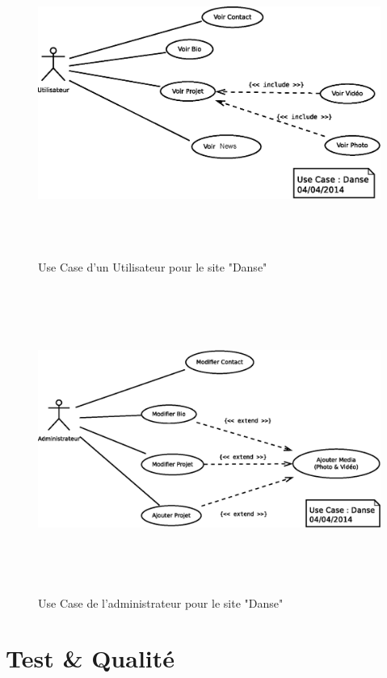 \documentclass[11pt,a4paper]{report}
\begin{document}
				\begin{figure}[H]
					\centering
					\includegraphics[height=10cm]{UseCase-Danse-User.eps}
					\caption[Use Case Utilisateur Danse]{Use Case d'un Utilisateur pour le site "Danse"}
					\label{fig:UseCase-Danse_User}
				\end{figure}
				\begin{figure}[H]
					\centering
					\includegraphics[height=10cm]{UseCase-Danse-Administrateur.eps}
					\caption[Use Case Administrateur Danse]{Use Case de l'administrateur pour le site "Danse"}
					\label{fig:UseCase-Danse_Admin}
				\end{figure}
				\newpage
				
	\section{Test \& Qualité}
\end{document}
